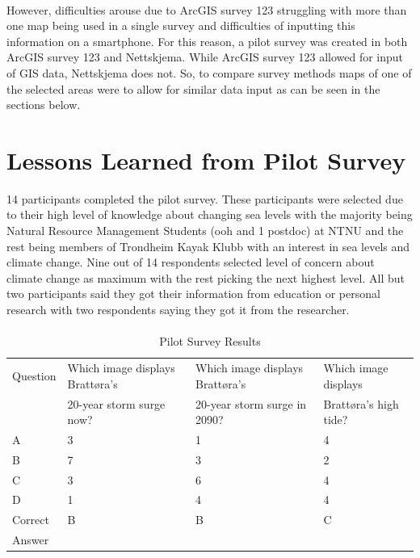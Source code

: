 \paragraph{}
However, difficulties arouse due to ArcGIS survey 123 struggling with more than one map being used in a single survey and difficulties of inputting this information on a smartphone. For this reason, a pilot survey was created in both ArcGIS survey 123 and Nettskjema. While ArcGIS survey 123 allowed for input of GIS data, Nettskjema does not. So, to compare survey methods maps of one of the selected areas were to allow for similar data input as can be seen in the sections below. 

\section{Lessons Learned from Pilot Survey}
14 participants completed the pilot survey. These participants were selected due to their high level of knowledge about changing sea levels with the majority being Natural Resource Management Students (ooh and 1 postdoc) at NTNU and the rest being members of Trondheim Kayak Klubb with an interest in sea levels and climate change. Nine out of 14 respondents selected level of concern about climate change as maximum with the rest picking the next highest level. All but two participants said they got their information from education or personal research with two respondents saying they got it from the researcher. 
\paragraph{}
\begin{table}[!ht]
    \centering
    \begin{tabular}{|l|l|l|l|}
    \hline
        Question & Which image displays Brattøra's  & Which image displays Brattøra's & Which image displays   \\ \newline
         & 20-year storm surge now? &  20-year storm surge in 2090? & Brattøra's high tide? \\ \hline
        A & 3 & 1 & 4 \\ \hline
        B & 7 & 3 & 2 \\ \hline
        C & 3 & 6 & 4 \\ \hline
        D & 1 & 4 & 4 \\ \hline
        Correct & B & B & C \\ \newline
        Answer &  &  &  \\ \hline
    \end{tabular}
    \caption{Pilot Survey Results}
    \label{table: pilot-survey}
\end{table}
